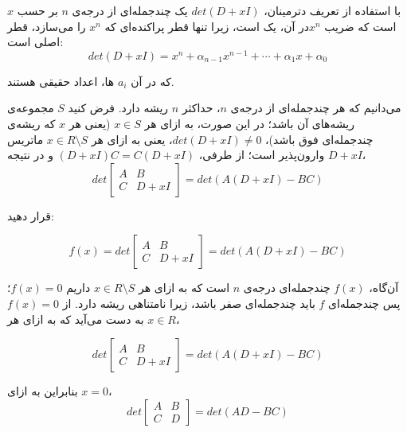 \begin{itemize}
با استفاده از تعریف دترمینان، $det(D+xI)$ یک چندجمله‌ای از درجه‌ی $n$ بر حسب $x$ است که ضریب $x^n$در آن، یک است، زیرا تنها قطر پراکنده‌ای که $x^n$ را می‌سازد، قطر اصلی است:
$$ det(D+xI) = x^n + \alpha_{n-1} x^{n-1} +\cdots + \alpha_1 x + \alpha_0 $$

که در آن $a_i$ ها، اعداد حقیقی هستند.

می‌دانیم که هر چندجمله‌ای از درجه‌ی $n$، حداکثر $n$ ریشه دارد. فرض کنید $S$ مجموعه‌ی ریشه‌های آن باشد؛ در این صورت، به ازای هر $x\in S$ (یعنی هر $x$ که ریشه‌ی چندجمله‌ای فوق باشد)، $det(D+xI)\neq 0$، یعنی به ازای هر 
$x \in R \setminus S$
ماتریس $D+xI$ وارون‌پذیر است؛ از طرفی،
$(D+xI)C = C(D+xI) $
و در نتیجه،
$$ det \begin{bmatrix}
A & B \\
C & D+xI
\end{bmatrix} = det(A(D+xI)-BC)$$

قرار دهید:

$$ f(x) = det \begin{bmatrix}
A & B \\
C & D+xI
\end{bmatrix} = det(A(D+xI)-BC) $$

آن‌گاه، $f(x)$ چندجمله‌ای درجه‌ی $n$ است که به ازای هر $x \in R \setminus S$ داریم $f(x)=0$؛ پس چندجمله‌ای $f$ باید چندجمله‌ای صفر باشد، زیرا نامتناهی ریشه دارد. از $f(x)=0$ به دست می‌آید که به ازای هر $x\in R$،
	
	$$ det \begin{bmatrix}
	A & B \\
	C & D+xI
	\end{bmatrix} = det(A(D+xI)-BC) $$
	
	بنابراین به ازای $x=0$،
	$$ det \begin{bmatrix}
	A & B \\
	C & D
	\end{bmatrix} = det(AD-BC) $$
	
\end{itemize}

